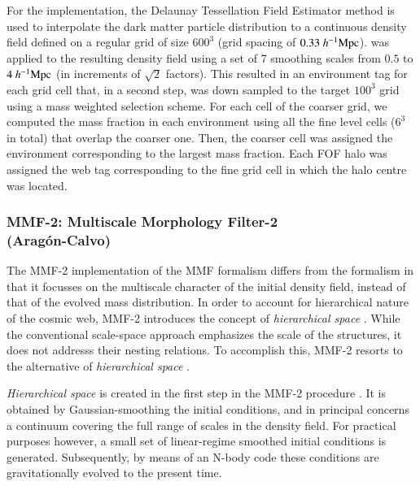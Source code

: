 For the \nexus{} implementation, the Delaunay Tessellation Field Estimator \dtfe{} method \citep{schaapwey2000,weyschaap2009} is  
used to interpolate the dark matter particle distribution to a continuous density field defined on a regular grid of size 
$600^3$ (grid spacing of $0.33~h^{-1}\rm Mpc$). \nexus{} was applied to the resulting density field using a set of 7 smoothing scales 
from $0.5$ to $4~h^{-1}\rm Mpc$ (in increments of $\sqrt{2}$ factors). This resulted in an environment tag for each grid cell that, in a second step, 
was down sampled to the target $100^3$ grid using a mass weighted selection scheme. For each cell of the coarser grid, we computed the mass 
fraction in each environment using all the fine level cells ($6^3$ in total) that overlap the coarser one. Then, the coarser cell was assigned 
the environment corresponding to the largest mass fraction. Each FOF halo was assigned the web tag corresponding to the fine grid cell in 
which the halo centre was located.

\subsubsection{MMF-2: Multiscale Morphology Filter-2\\ \hskip 0.9cm (Arag\'on-Calvo)}
\label{section:MMF}
The MMF-2 implementation of the MMF formalism differs from the \Nexus{} formalism in that it focusses on the multiscale character 
of the initial density field, instead of that of the evolved mass distribution. 
In order to account for hierarchical nature of the cosmic web, MMF-2 introduces the concept of \textit{hierarchical space} 
\citep{aragon2010, aragon2013}. While the conventional scale-space approach emphasizes the scale of the structures, it does 
not addresss their nesting relations. To accomplish this, MMF-2 resorts to the alternative of \textit{hierarchical space} 
\citep{aragon2010, aragon2013, aragon2014}. 

\textit{Hierarchical space} is created in the 
first step in the MMF-2 procedure \citep{aragon2010, aragon2013}. It is obtained by Gaussian-smoothing the initial conditions, 
and in principal concerns a continuum covering the full range of scales in the density field. For practical purposes however, a 
small set of linear-regime smoothed initial conditions is generated. Subsequently, by means of an N-body code these conditions 
are gravitationally evolved to the present time. 

